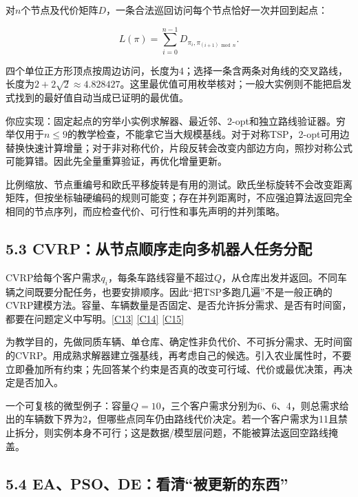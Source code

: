 对\(n\)个节点及代价矩阵\(D\)，一条合法巡回访问每个节点恰好一次并回到起点：

\[
L(\pi)=\sum_{i=0}^{n-1}D_{\pi_i,\pi_{(i+1)\bmod n}}.
\]

四个单位正方形顶点按周边访问，长度为4；选择一条含两条对角线的交叉路线，长度为\(2+2\sqrt2\approx4.828427\)。这里最优值可用枚举核对；一般大实例则不能把启发式找到的最好值自动当成已证明的最优值。

你应实现：固定起点的穷举小实例求解器、最近邻、2-opt和独立路线验证器。穷举仅用于\(n\le9\)的教学检查，不能拿它当大规模基线。对于对称TSP，2-opt可用边替换快速计算增量；对于非对称代价，片段反转会改变内部边方向，照抄对称公式可能算错。因此先全量重算验证，再优化增量更新。

比例缩放、节点重编号和欧氏平移旋转是有用的测试。欧氏坐标旋转不会改变距离矩阵，但按坐标轴硬编码的规则可能变；存在并列距离时，不应强迫算法返回完全相同的节点序列，而应检查代价、可行性和事先声明的并列策略。

\subsection{5.3
CVRP：从节点顺序走向多机器人任务分配}\label{cvrpux4eceux8282ux70b9ux987aux5e8fux8d70ux5411ux591aux673aux5668ux4ebaux4efbux52a1ux5206ux914d}

CVRP给每个客户需求\(q_i\)，每条车路线容量不超过\(Q\)，从仓库出发并返回。不同车辆之间既要分配任务，也要安排顺序。因此``把TSP多跑几遍''不是一般正确的CVRP建模方法。容量、车辆数量是否固定、是否允许拆分需求、是否有时间窗，都要在问题定义中写明。\href{https://github.com/PyVRP/PyVRP}{{[}C13{]}}
\href{https://github.com/vidalt/HGS-CVRP}{{[}C14{]}}
\href{https://developers.google.com/optimization/routing/vrp}{{[}C15{]}}

为教学目的，先做同质车辆、单仓库、确定性非负代价、不可拆分需求、无时间窗的CVRP。用成熟求解器建立强基线，再考虑自己的候选。引入农业属性时，不要立即叠加所有约束；先回答某个约束是否真的改变可行域、代价或最优决策，再决定是否加入。

一个可复核的微型例子：容量\(Q=10\)，三个客户需求分别为6、6、4，则总需求给出的车辆数下界为2，但哪些点同车仍由路线代价决定。若一个客户需求为11且禁止拆分，则实例本身不可行；这是数据/模型层问题，不能被算法返回空路线掩盖。

\subsection{5.4
EA、PSO、DE：看清``被更新的东西''}\label{eapsodeux770bux6e05ux88abux66f4ux65b0ux7684ux4e1cux897f}

